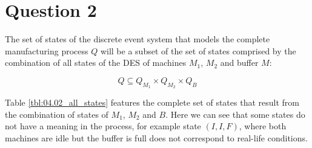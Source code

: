 \section{Question 2}

The set of states of the discrete event system that models the complete
manufacturing process $Q$ will be a subset of the set of states comprised by
the combination of all states of the DES of machines $M_1$, $M_2$ and buffer $M$:

$$Q \subseteq Q_{M_1} \times Q_{M_2} \times Q_{B}$$

Table \ref{tbl:04.02_all_states} features the complete set of states that result
from the combination of states of $M_1$, $M_2$ and $B$. Here we can see that
some states do not have a meaning in the process, for example state $(I,I,F)$,
where both machines are idle but the buffer is full does not correspond to
real-life conditions.


